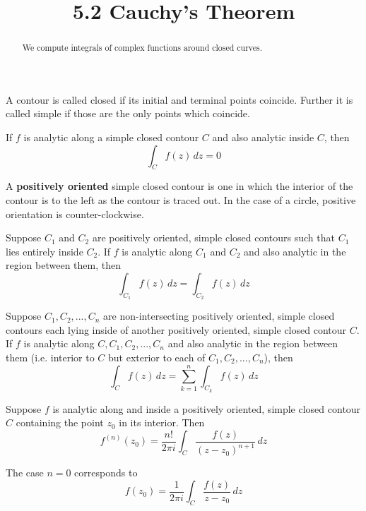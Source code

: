 \documentclass[handout]{ximera}
\title{5.2 Cauchy's Theorem}
\begin{document}
\begin{abstract}
We compute integrals of complex functions around closed curves.
\end{abstract}

\maketitle

A contour is called closed if its initial and terminal points coincide.  Further it is called simple if those are the only points which coincide. 
\begin{theorem}
If $f$ is analytic along a simple closed contour $C$ and also analytic inside $C$, then
\[
\int_C f(z) \, dz = 0
\]
\end{theorem}

A \textbf{positively oriented} simple closed contour is one in which the interior of the contour is to the left as the contour is traced out.
In the case of a circle, positive orientation is counter-clockwise. 

\begin{theorem}
Suppose $C_1$ and $C_2$ are positively oriented, simple closed contours such that $C_1$ lies entirely inside $C_2$. If $f$ is analytic 
along $C_1$ and $C_2$ and also analytic in the region between them, then
\[
\int_{C_1} f(z) \, dz = \int_{C_2} f(z) \, dz
\]
\end{theorem}


\begin{theorem}
Suppose $C_1, C_2, ..., C_n$ are non-intersecting positively oriented, simple closed contours each lying inside of another positively oriented, simple closed contour $C$.  
If $f$ is analytic along $C, C_1, C_2, ..., C_n$ and also analytic in the region between them (i.e. interior to $C$ but exterior to each of $C_1, C_2, ..., C_n$), then
\[
\int_C f(z) \, dz = \sum_{k=1}^n \int_{C_k} f(z) \, dz
\]
\end{theorem}



\begin{theorem}
Suppose $f$ is analytic along and inside a positively oriented, simple closed contour $C$ containing the point $z_0$ in its interior.
Then
\[
f^{(n)}(z_0) = \frac{n!}{2\pi i} \int_C \frac{f(z)}{(z-z_0)^{n+1}} \, dz
\]
\end{theorem}

\begin{remark}
The case $n=0$ corresponds to 
\[
f(z_0) = \frac{1}{2\pi i} \int_C \frac{f(z)}{z-z_0} \, dz
\]
\end{remark}
\end{document}
